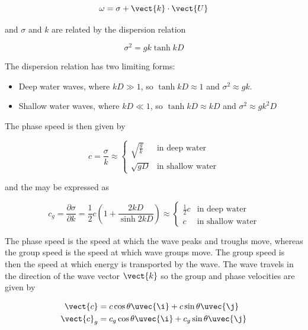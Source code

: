 \begin{equation}
    \omega = \sigma + \vect{k} \cdot \vect{U}
    \label{eqn:doppler}
\end{equation}

and $\sigma$ and $k$ are related by the dispersion relation

\begin{equation}
    \sigma^2 = gk\tanh{kD}
    \label{eqn:disprel}
\end{equation}

The dispersion relation has two limiting forms:

\begin{itemize}
    \item Deep water waves, where $kD \gg 1$, so $\tanh{kD} \approx 1$ and $\sigma^2 \approx gk$.
    \item Shallow water waves, where $kD \ll 1$, so $\tanh{kD} \approx kD$ and $\sigma^2 \approx gk^2D$
\end{itemize}

The phase speed is then given by

\begin{equation}
c = \frac{\sigma}{k} \approx \begin{cases}
            \sqrt{\frac{g}{k}} &\text{in deep water} \\
            \sqrt{gD} &\text{in shallow water}
\end{cases}
\label{eqn:pspeed}
\end{equation}

and the  may be expressed as

\begin{equation}
c_g = \frac{\partial\sigma}{\partial k} = \frac{1}{2}c \left(1 + \frac{2kD}{\sinh{2kD}} \right) \approx \begin{cases}
    \frac{1}{2} c &\text{in deep water} \\
    c &\text{in shallow water}
\end{cases}
\label{eqn:gspeed}
\end{equation}

The phase speed is the speed at which the wave peaks and troughs move, whereas the group speed is the speed at which wave groups move. The group speed is then the speed at which energy is transported by the wave. The wave travels in the direction of the wave vector $\vect{k}$ so the group and phase velocities are given by

\begin{align*}
\vect{c}& = c \cos \theta \uvec{\i} + c \sin \theta \uvec{\j} \\
\vect{c}_g& = c_g \cos \theta \uvec{\i} + c_g \sin \theta \uvec{\j}
\end{align*}

